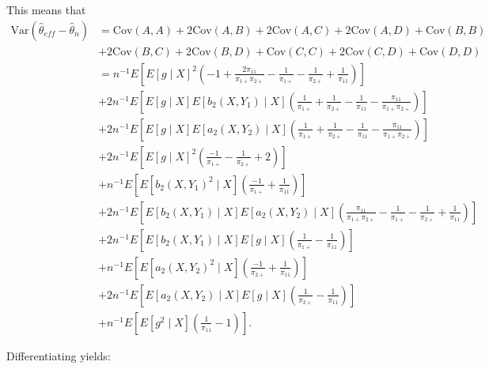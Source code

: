 \documentclass[12pt]{article}
\newcommand{\Cov}{{\text{Cov}}}
\newcommand{\Var}{{\text{Var}}}
\begin{document}
\begin{itemize}
    This means that
    \begin{align*}
      \Var(\hat \theta_{eff} - \hat \theta_n) 
      &= \Cov(A, A) + 2 \Cov(A, B) + 2 \Cov(A, C) + 2 \Cov(A, D) + \Cov(B, B) \\
      &+ 2 \Cov(B, C) + 2 \Cov(B, D) + \Cov(C, C) + 2 \Cov(C, D) + \Cov(D, D) \\
      &= n^{-1} E \left[ E[g \mid X]^2 \left(-1 + \frac{2 \pi_{11}}{\pi_{1+}
      \pi_{2+}} - \frac{1}{\pi_{1+}} - \frac{1}{\pi_{2+}} +
      \frac{1}{\pi_{11}}\right)\right] \\
      &+ 2 n^{-1} E\left[E[g \mid X] E[b_2(X, Y_1) \mid X]
      \left(\frac{1}{\pi_{1+}} + \frac{1}{\pi_{2+}} - \frac{1}{\pi_{11}} -
      \frac{\pi_{11}}{\pi_{1+} \pi_{2+}}\right)\right]\\
      &+ 2 n^{-1} E\left[E[g \mid X] E[a_2(X, Y_2) \mid X]
      \left(\frac{1}{\pi_{1+}} + \frac{1}{\pi_{2+}} - \frac{1}{\pi_{11}} -
      \frac{\pi_{11}}{\pi_{1+} \pi_{2+}}\right)\right]\\
      &+ 2 n^{-1} E\left[E[g \mid X]^2 \left(\frac{-1}{\pi_{1+}} -
      \frac{1}{\pi_{2+}} + 2\right)\right]\\
      &+ n^{-1} E\left[ E[b_2(X, Y_1)^2 \mid X] \left(\frac{-1}{\pi_{1+}} +
      \frac{1}{\pi_{11}}\right)\right]\\
      &+ 2 n^{-1} E\left[E[b_2(X, Y_1) \mid X] E[a_2(X, Y_2) \mid X]
      \left(\frac{\pi_{11}}{\pi_{1+} \pi_{2+}} - \frac{1}{\pi_{1+}} -
      \frac{1}{\pi_{2+}} + \frac{1}{\pi_{11}}\right)\right]\\
      &+ 2 n^{-1} E\left[ E[b_2(X, Y_1) \mid X] E[g \mid X]
      \left(\frac{1}{\pi_{1+}} - \frac{1}{\pi_{11}}\right)\right]\\
      &+  n^{-1} E\left[ E[a_2(X, Y_2)^2 \mid X]
      \left(\frac{-1}{\pi_{2+}} + \frac{1}{\pi_{11}}\right) \right]\\
      &+ 2 n^{-1} E\left[ E[a_2(X, Y_2) \mid X] E[g \mid X]
      \left(\frac{1}{\pi_{2+}} - \frac{1}{\pi_{11}}\right)\right]\\
      &+ n^{-1} E\left[ E[g^2 \mid X] \left(\frac{1}{\pi_{11}} -
      1\right)\right].
    \end{align*}

    Differentiating yields:


\end{itemize}
\end{document}
